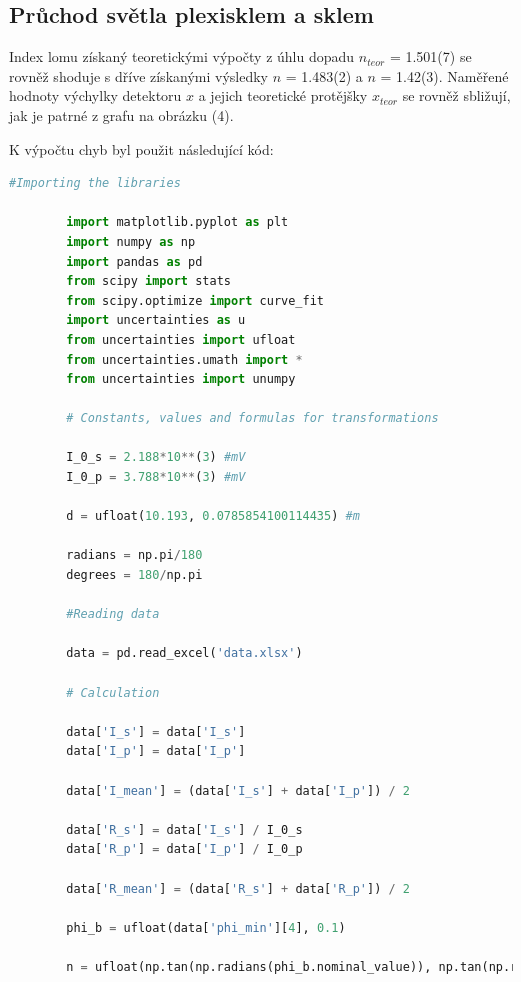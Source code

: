 \documentclass[a4paper,11pt]{article}
\begin{document}
\begin{minipage}[t]{0.5\textwidth}
            \subsection{Průchod světla plexisklem a sklem}
                Index lomu získaný teoretickými výpočty z úhlu dopadu $n_{teor}$ = 1.501(7) se rovněž shoduje s dříve získanými výsledky $n$ = 1.483(2) a $n$ = 1.42(3). Naměřené hodnoty výchylky detektoru $x$ a jejich teoretické protějšky $x_{teor}$ se rovněž sbližují, jak je patrné z grafu na obrázku (4).
    \end{minipage}
\newpage
    \par K výpočtu chyb byl použit následující kód: 
    \begin{lstlisting}[language=Python, basicstyle=\tiny, breaklines=true, postbreak=\mbox{\textbackslashspace}]
        #Importing the libraries

        import matplotlib.pyplot as plt
        import numpy as np
        import pandas as pd
        from scipy import stats
        from scipy.optimize import curve_fit
        import uncertainties as u 
        from uncertainties import ufloat
        from uncertainties.umath import *
        from uncertainties import unumpy

        # Constants, values and formulas for transformations

        I_0_s = 2.188*10**(3) #mV
        I_0_p = 3.788*10**(3) #mV
        
        d = ufloat(10.193, 0.0785854100114435) #m
        
        radians = np.pi/180
        degrees = 180/np.pi

        #Reading data

        data = pd.read_excel('data.xlsx')

        # Calculation 

        data['I_s'] = data['I_s']
        data['I_p'] = data['I_p']
        
        data['I_mean'] = (data['I_s'] + data['I_p']) / 2 
        
        data['R_s'] = data['I_s'] / I_0_s
        data['R_p'] = data['I_p'] / I_0_p
        
        data['R_mean'] = (data['R_s'] + data['R_p']) / 2
        
        phi_b = ufloat(data['phi_min'][4], 0.1)
        
        n = ufloat(np.tan(np.radians(phi_b.nominal_value)), np.tan(np.radians(phi_b.std_dev)))
        

\end{lstlisting}
\end{document}
